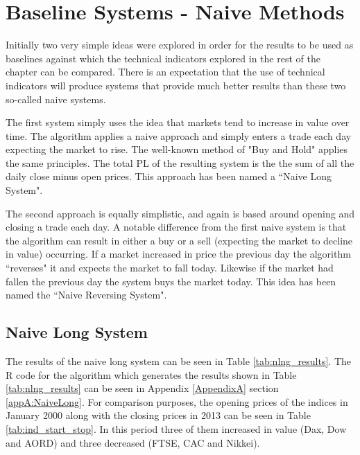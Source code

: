 \section{Baseline Systems - Naive Methods}
Initially two very simple ideas were explored in order for the results to be used as baselines against which the technical indicators explored in the rest of the chapter can be compared. There is an expectation that the use of technical indicators will produce systems that provide much better results than these two so-called naive systems.

The first system simply uses the idea that markets tend to increase in value over time. The algorithm applies a naive approach and simply enters a trade each day expecting the market to rise. The well-known method of "Buy and Hold" applies the same principles. The total PL of the resulting system is the the sum of all the daily close minus open prices. This approach has been named a \textquotedblleft Naive Long System".

The second approach is equally simplistic, and again is based around opening and closing a trade each day. A notable difference from the first naive system is that the algorithm can result in either a buy or a sell (expecting the market to decline in value) occurring. If a market increased in price the previous day the algorithm \textquotedblleft reverses" it and expects the market to fall today. Likewise if the market had fallen the previous day the system buys the market today. This idea has been named the \textquotedblleft Naive Reversing System".

\subsection{Naive Long System}
The results of the naive long system can be seen in Table \ref{tab:nlng_results}. The R code for the algorithm which generates the results shown in Table \ref{tab:nlng_results} can be seen in Appendix \ref{AppendixA} section \ref{appA:NaiveLong}. For comparison purposes, the opening prices of the indices in January 2000 along with the closing prices in 2013 can be seen in Table \ref{tab:ind_start_stop}. In this period three of them increased in value (Dax, Dow and AORD) and three decreased (FTSE, CAC and Nikkei).

